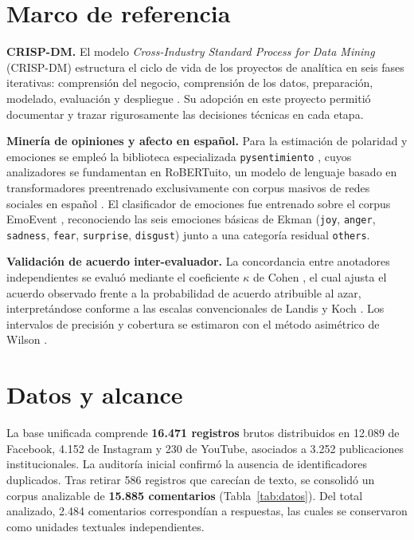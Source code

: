 \documentclass[conference]{IEEEtran}
\begin{document}
\section{Marco de referencia}
\textbf{CRISP-DM.} El modelo \emph{Cross-Industry Standard Process for Data Mining} (CRISP-DM) estructura el ciclo de vida de los proyectos de anal\'itica en seis fases iterativas: comprensi\'on del negocio, comprensi\'on de los datos, preparaci\'on, modelado, evaluaci\'on y despliegue \cite{chapman2000}. Su adopci\'on en este proyecto permiti\'o documentar y trazar rigurosamente las decisiones t\'ecnicas en cada etapa.

\textbf{Miner\'ia de opiniones y afecto en espa\~nol.} Para la estimaci\'on de polaridad y emociones se emple\'o la biblioteca especializada \texttt{pysentimiento} \cite{perez2021}, cuyos analizadores se fundamentan en RoBERTuito, un modelo de lenguaje basado en transformadores preentrenado exclusivamente con corpus masivos de redes sociales en espa\~nol \cite{perez2022}. El clasificador de emociones fue entrenado sobre el corpus EmoEvent \cite{plaza2020}, reconociendo las seis emociones b\'asicas de Ekman \cite{ekman1992} (\texttt{joy}, \texttt{anger}, \texttt{sadness}, \texttt{fear}, \texttt{surprise}, \texttt{disgust}) junto a una categor\'ia residual \texttt{others}.

\textbf{Validaci\'on de acuerdo inter-evaluador.} La concordancia entre anotadores independientes se evalu\'o mediante el coeficiente $\kappa$ de Cohen \cite{cohen1960}, el cual ajusta el acuerdo observado frente a la probabilidad de acuerdo atribuible al azar, interpret\'andose conforme a las escalas convencionales de Landis y Koch \cite{landis1977}. Los intervalos de precisi\'on y cobertura se estimaron con el m\'etodo asim\'etrico de Wilson \cite{wilson1927}.

\section{Datos y alcance}
La base unificada comprende \textbf{16.471 registros} brutos distribuidos en 12.089 de Facebook, 4.152 de Instagram y 230 de YouTube, asociados a 3.252 publicaciones institucionales. La auditor\'ia inicial confirm\'o la ausencia de identificadores duplicados. Tras retirar 586 registros que carec\'ian de texto, se consolid\'o un corpus analizable de \textbf{15.885 comentarios} (Tabla~\ref{tab:datos}). Del total analizado, 2.484 comentarios correspond\'ian a respuestas, las cuales se conservaron como unidades textuales independientes.
\end{document}
